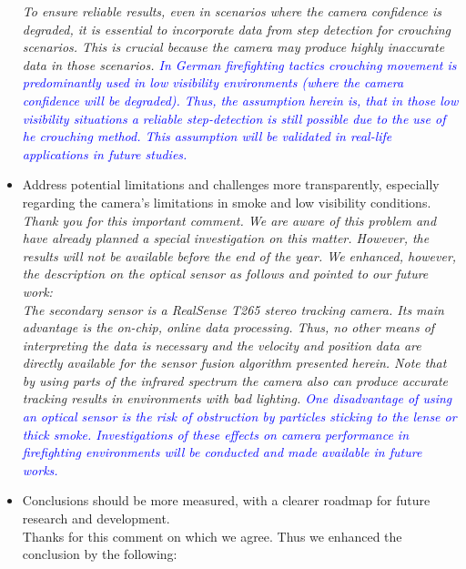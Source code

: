 \documentclass{article}
\begin{document}
\begin{itemize}
\textit{To ensure reliable results, even in scenarios where the camera confidence is degraded, it is essential to incorporate data from step detection for crouching scenarios. This is crucial because the camera  may produce highly inaccurate data in those scenarios. \textcolor{blue}{In German firefighting tactics crouching movement is predominantly used in low visibility environments (where the camera confidence will be degraded). Thus, the assumption herein is, that in those low visibility situations a reliable step-detection is still possible due to the use of he crouching method. This assumption will be validated in real-life applications in future studies.}}

\item Address potential limitations and challenges more transparently, especially regarding the camera's limitations in smoke and low visibility conditions.\\


\textit{Thank you for this important comment. We are aware of this problem and have already planned a special investigation on this matter. However, the results will not be available before the end of the year.  We enhanced, however,  the description on the optical sensor as follows and pointed to our future work:\\	
	The secondary sensor is a RealSense T265 stereo tracking camera. Its main advantage is the on-chip, online data processing. Thus, no other means of interpreting the data is necessary and the velocity and position data are directly available for the sensor  fusion algorithm presented herein. Note that by using parts of the infrared spectrum the camera also can produce accurate tracking results in environments with bad lighting. \textcolor{blue}{One disadvantage of using an optical sensor is the risk of obstruction by particles sticking to the lense or thick smoke.  Investigations of these effects on camera performance in firefighting environments will be conducted and made available in  future works.}}\\



\item Conclusions should be more measured, with a clearer roadmap for future research and development.\\

Thanks for this comment on which we agree. Thus we enhanced the conclusion by the following:


\end{itemize}
\end{document}
